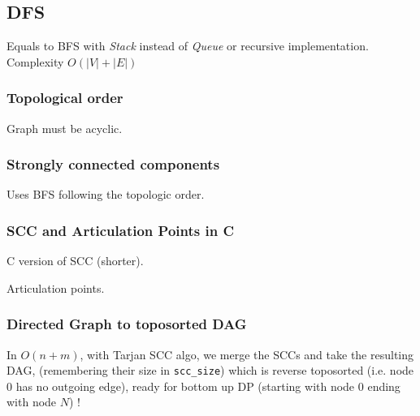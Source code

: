 \subsection{DFS}
Equals to BFS with \textit{Stack} instead of \textit{Queue} or recursive implementation. Complexity $O(|V|+|E|)$\\

\subsubsection{Topological order}
Graph must be acyclic. \\


\subsubsection{Strongly connected components}
Uses BFS following the topologic order. \\


\subsubsection{SCC and Articulation Points in C}
C version of SCC (shorter).



Articulation points.



\subsubsection{Directed Graph to toposorted DAG}
In $O(n + m)$, with Tarjan SCC algo,
we merge the SCCs and take the resulting DAG,
(remembering their size in \lstinline|scc_size|)
which is reverse toposorted (i.e. node 0 has no outgoing edge),
ready for bottom up DP (starting with node 0 ending with node $N$) !


